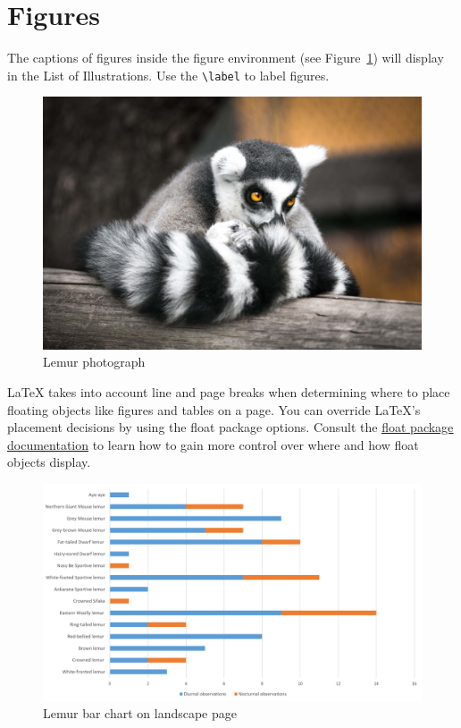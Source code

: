 \section{Figures}
The captions of figures inside the figure environment (see Figure~\ref{fig:lemur1}) will display in the List of Illustrations. Use the \verb|\label| to label figures.
\begin{figure}[H]
\begin{center}
\includegraphics{figs/lemurphoto}
\caption{Lemur photograph} \label{fig:lemur1}
\end{center}
\end{figure}

LaTeX takes into account line and page breaks when determining where to place floating objects like figures and tables on a page. You can override LaTeX's placement decisions by using the float package options. Consult the \underline{\href{https://ctan.org/pkg/float}{float package documentation}} to learn how to gain more control over where and how float objects display.
 
\begin{landscape}
\begin{figure}[H]
\begin{center}
\includegraphics{figs/lemurchart}
\caption{Lemur bar chart on landscape page} \label{fig:landlemur1}
\end{center}
\end{figure}
\end{landscape}


